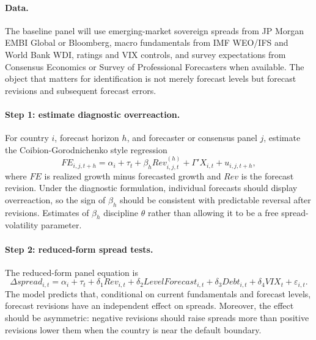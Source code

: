 \documentclass[11pt]{article}
\begin{document}
\paragraph{Data.} The baseline panel will use emerging-market sovereign spreads from JP Morgan EMBI Global or Bloomberg, macro fundamentals from IMF WEO/IFS and World Bank WDI, ratings and VIX controls, and survey expectations from Consensus Economics or Survey of Professional Forecasters when available. The object that matters for identification is not merely forecast levels but forecast revisions and subsequent forecast errors.

\paragraph{Step 1: estimate diagnostic overreaction.} For country $i$, forecast horizon $h$, and forecaster or consensus panel $j$, estimate the Coibion-Gorodnichenko style regression
\begin{equation}
FE_{i,j,t+h}=\alpha_i+\tau_t+\beta_h Rev_{i,j,t}^{(h)}+\Gamma'X_{i,t}+u_{i,j,t+h}, \label{eq:CG}
\end{equation}
where $FE$ is realized growth minus forecasted growth and $Rev$ is the forecast revision. Under the diagnostic formulation, individual forecasts should display overreaction, so the sign of $\beta_h$ should be consistent with predictable reversal after revisions. Estimates of $\beta_h$ discipline $\theta$ rather than allowing it to be a free spread-volatility parameter.

\paragraph{Step 2: reduced-form spread tests.} The reduced-form panel equation is
\begin{equation}
\Delta spread_{i,t}=\alpha_i+\tau_t+\delta_1 Rev_{i,t}+\delta_2 LevelForecast_{i,t}+\delta_3 Debt_{i,t}+\delta_4 VIX_t+\varepsilon_{i,t}. \label{eq:spread-panel}
\end{equation}
The model predicts that, conditional on current fundamentals and forecast levels, forecast revisions have an independent effect on spreads. Moreover, the effect should be asymmetric: negative revisions should raise spreads more than positive revisions lower them when the country is near the default boundary.
\end{document}
